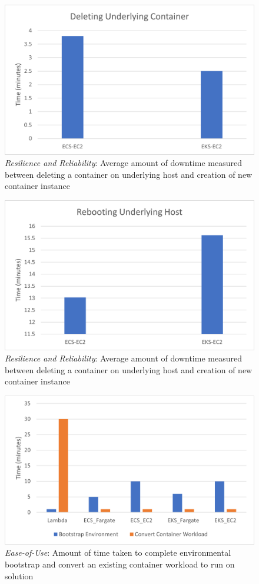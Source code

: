 \begin{figure}[hp]
  \includegraphics{images/rr-deleteContainer.png}
  \caption{\emph{Resilience and Reliability}: Average amount of downtime measured between deleting a container on underlying host and creation of new container instance}
  \label{fig:rr_deleteContainer}
\end{figure}

\begin{figure}[hp]
  \includegraphics{images/rr-reboot.png}
  \caption{\emph{Resilience and Reliability}: Average amount of downtime measured between deleting a container on underlying host and creation of new container instance}
  \label{fig:rr_reboot}
\end{figure}

\begin{figure}[hp]
  \includegraphics{images/eou.png}
  \caption{\emph{Ease-of-Use}: Amount of time taken to complete environmental bootstrap and convert an existing container workload to run on solution}
  \label{fig:eou}
\end{figure}
